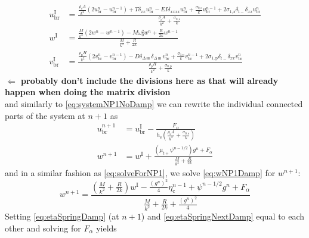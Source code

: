\documentclass{article}
\begin{document}
\begin{subequations}\label{eq:intermediateDamp}
    \begin{align}
        u^\text{I}_\text{br}& = \frac{\frac{\rho_\text{s} A}{k^2}(2u_\text{br}^n-u_\text{br}^{n-1})+T\delta_{xx}u_\text{br}^n-EI\delta_{xxxx}u_\text{br}^n + \frac{\sigma_{0,\text{s}}}{k}u_\text{br}^{n-1} + 2\sigma_{1,\text{s}}\delta_{t-}\delta_{xx}u^n_\text{br}}{\frac{\rho_\text{s}A}{k^2} + \frac{\sigma_{0,\text{s}}}{k}} \\
        w^\text{I} & = \frac{\frac{M}{k^2}(2w^n-w^{n-1})-M\omega_0^2w^n+\frac{R}{2k}w^{n-1}}{\frac{M}{k^2} + \frac{R}{2k}}\\
        v^\text{I}_{\text{br}} & = \frac{\frac{\rho_\text{p}H}{k^2}(2v_{\text{br}}^n-v_{\text{br}}^{n-1})-D\delta_{\Delta\boxplus}\delta_{\Delta\boxplus}v_{\text{br}}^n+\frac{\sigma_{0,\text{p}}}{k}v^{n-1}_\text{br}+ 2\sigma_{1,\text{p}}\delta_{t-}\delta_{xx}v^n_\text{br}}{\frac{\rho_\text{p}H}{k^2}+\frac{\sigma_{0,\text{p}}}{k}}
    \end{align}
\end{subequations}
\textbf{$\Leftarrow$ probably don't include the divisions here as that will already happen when doing the matrix division}\\
and similarly to \eqref{eq:systemNP1NoDamp} we can rewrite the individual connected parts of the system at $n+1$ as
\begin{subequations}
\begin{align}
    u_\text{br}^{n+1}&=u_\text{br}^\text{I} - \frac{F_\alpha}{h_\text{s}(\frac{\rho_\text{s}A}{k^2}+\frac{\sigma_{0,\text{s}}}{k})}\\
        w^{n+1} &= w^\text{I} + \frac{(\mu_{t+}\psi^{n-1/2})g^n + F_\alpha}{\frac{M}{k^2}+\frac{R}{2k}}\label{eq:wNP1Damp}%
        \end{align}
\end{subequations}
and in a similar fashion as \eqref{eq:solveForNP1}, we solve \eqref{eq:wNP1Damp} for $w^{n+1}$:
\begin{equation}
    w^{n+1} = \frac{\left(\frac{M}{k^2}+\frac{R}{2k}\right)w^\text{I}-\frac{(g^n)^2}{4}\eta_\text{c}^{n-1}+\psi^{n-1/2}g^n+F_\alpha}{\frac{M}{k^2}+\frac{R}{2k}+\frac{(g^n)^2}{4}}
\end{equation}
Setting \eqref{eq:etaSpringDamp} (at $n+1$) and \eqref{eq:etaSpringNextDamp} equal to each other and solving for $F_\alpha$ yields
\end{document}
